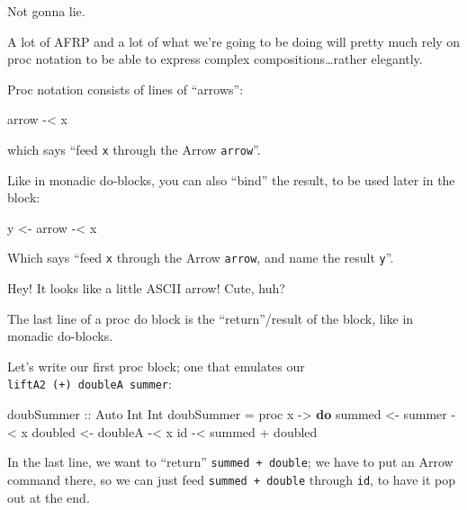 \documentclass[]{article}
\newenvironment{Shaded}{}{}
\newcommand{\DataTypeTok}[1]{\textcolor[rgb]{0.56,0.13,0.00}{#1}}
\newcommand{\FunctionTok}[1]{\textcolor[rgb]{0.02,0.16,0.49}{#1}}
\newcommand{\KeywordTok}[1]{\textcolor[rgb]{0.00,0.44,0.13}{\textbf{#1}}}
\newcommand{\NormalTok}[1]{#1}
\newcommand{\OtherTok}[1]{\textcolor[rgb]{0.00,0.44,0.13}{#1}}
\begin{document}
Not gonna lie.

A lot of AFRP and a lot of what we're going to be doing will pretty much rely on
proc notation to be able to express complex compositions\ldots{}rather
elegantly.

Proc notation consists of lines of ``arrows'':

\begin{Shaded}
\begin{Highlighting}[]
\NormalTok{arrow }\FunctionTok{-<}\NormalTok{ x}
\end{Highlighting}
\end{Shaded}

which says ``feed \texttt{x} through the Arrow \texttt{arrow}''.

Like in monadic do-blocks, you can also ``bind'' the result, to be used later in
the block:

\begin{Shaded}
\begin{Highlighting}[]
\NormalTok{y }\OtherTok{<-}\NormalTok{ arrow }\FunctionTok{-<}\NormalTok{ x}
\end{Highlighting}
\end{Shaded}

Which says ``feed \texttt{x} through the Arrow \texttt{arrow}, and name the
result \texttt{y}''.

Hey! It looks like a little ASCII arrow! Cute, huh?

The last line of a proc do block is the ``return''/result of the block, like in
monadic do-blocks.

Let's write our first proc block; one that emulates our
\texttt{liftA2\ (+)\ doubleA\ summer}:

\begin{Shaded}
\begin{Highlighting}[]
\OtherTok{doubSummer ::} \DataTypeTok{Auto} \DataTypeTok{Int} \DataTypeTok{Int}
\NormalTok{doubSummer }\FunctionTok{=}\NormalTok{ proc x }\OtherTok{->} \KeywordTok{do}
\NormalTok{    summed  }\OtherTok{<-}\NormalTok{ summer  }\FunctionTok{-<}\NormalTok{ x}
\NormalTok{    doubled }\OtherTok{<-}\NormalTok{ doubleA }\FunctionTok{-<}\NormalTok{ x}
\NormalTok{    id }\FunctionTok{-<}\NormalTok{ summed }\FunctionTok{+}\NormalTok{ doubled}
\end{Highlighting}
\end{Shaded}

In the last line, we want to ``return'' \texttt{summed\ +\ double}; we have to
put an Arrow command there, so we can just feed \texttt{summed\ +\ double}
through \texttt{id}, to have it pop out at the end.
\end{document}

